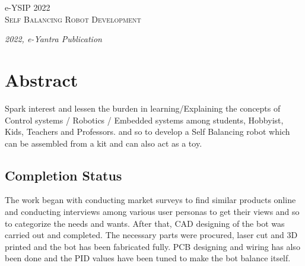 \documentclass[12pt,a4paper,oneside]{book}
\begin{document}
	\begin{titlepage}
	\raggedright
	{\Large e-YSIP 2022\\[1cm]}
	{\Huge\scshape Self Balancing Robot Development \\[0.1in]}
	\vfill
	{\itshape 2022, e-Yantra Publication}
	\end{titlepage}
	
	
	\section*{Abstract}
		Spark interest and lessen the burden in learning/Explaining the concepts of Control systems / Robotics / Embedded systems among students, Hobbyist, Kids, Teachers and Professors.  and so to develop a Self Balancing robot which can be assembled from a kit and can also act as a toy. 
		\subsection*{Completion Status}
		The work began with conducting market surveys to find similar products online and conducting interviews among various user personas to get their views and so to categorize the needs and wants. After that, CAD designing of the bot was carried out and completed. The necessary parts were procured, laser cut and 3D printed and the bot has been fabricated fully. PCB designing and wiring has also been done and the PID values have been tuned to make the bot balance itself.
\end{document}
